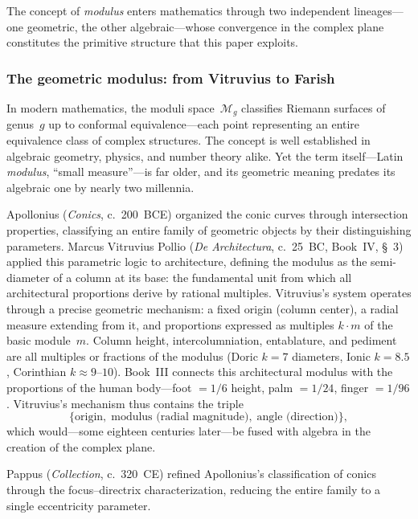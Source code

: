 The concept of \emph{modulus} enters mathematics through two
independent lineages---one geometric, the other algebraic---whose
convergence in the complex plane constitutes the primitive structure
that this paper exploits.

\subsubsection{The geometric modulus: from Vitruvius to Farish}\label{sec:vitruvian}

In modern mathematics, the moduli space~$\mathcal{M}_g$ classifies
Riemann surfaces of genus~$g$ up to conformal equivalence---each point
representing an entire equivalence class of complex structures.  The
concept is well established in algebraic
geometry, physics, and number theory alike.  Yet the term
itself---Latin \emph{modulus}, ``small measure''---is far older, and
its geometric meaning predates its algebraic one by nearly two
millennia.

Apollonius (\emph{Conics}, c.~200~BCE) organized the conic curves
through intersection properties, classifying an entire family of
geometric objects by their distinguishing parameters.
Marcus Vitruvius Pollio (\emph{De Architectura},
c.~25~BC, Book~IV, \S~3) applied this parametric logic to architecture,
defining the modulus as the semi-diameter of a
column at its base: the fundamental unit from which all architectural
proportions derive by rational multiples.  Vitruvius's system operates
through a precise geometric mechanism: a fixed origin (column center),
a radial measure extending from it, and proportions expressed as
multiples $k \cdot m$ of the basic module~$m$.  Column height,
intercolumniation, entablature, and pediment are all multiples or
fractions of the modulus (Doric $k = 7$ diameters, Ionic $k = 8.5$,
Corinthian $k \approx 9$--$10$).  Book~III connects this architectural
modulus with the proportions of the human body---foot $= 1/6$ height,
palm $= 1/24$, finger $= 1/96$.  Vitruvius's mechanism thus contains the triple
\begin{equation}\label{eq:triple}
  \{\text{origin},\;\text{modulus (radial magnitude)},\;\text{angle
  (direction)}\},
\end{equation}
which would---some eighteen centuries later---be fused with algebra in
the creation of the complex plane.

Pappus (\emph{Collection}, c.~320~CE) refined Apollonius's
classification of conics through the focus--directrix characterization,
reducing the entire family to a single eccentricity parameter.

